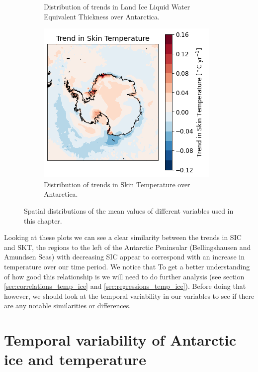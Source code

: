 \documentclass[../main.tex]{subfiles}
\begin{document}
\begin{figure}[H]
\begin{subfigure}[h!]{0.49\textwidth}
\caption{Distribution of trends in Land Ice Liquid Water Equivalent Thickness over Antarctica.}
\end{subfigure}
\begin{subfigure}[h!]{0.49\textwidth}
\includegraphics[width=\textwidth]{images/week8/lres/trend_skt_distribution}
\caption{Distribution of trends in Skin Temperature over Antarctica.}
\end{subfigure}
\caption{Spatial distributions of the mean values of different variables used in this chapter.}
\label{fig:trend_distributions}
\end{figure}

Looking at these plots we can see a clear similarity between the trends in SIC and SKT, the regions to the left of the Antarctic Peninsular (Bellingshausen and Amundsen Seas) with decreasing SIC appear to correspond with an increase in temperature over our time period.
We notice that
To get a better understanding of how good this relationship is we will need to do further analysis (see section \ref{sec:correlations_temp_ice} and \ref{sec:regressions_temp_ice}). Before doing that however, we should look at the temporal variability in our variables to see if there are any notable similarities or differences.

\section{Temporal variability of Antarctic ice and temperature}
\end{document}
